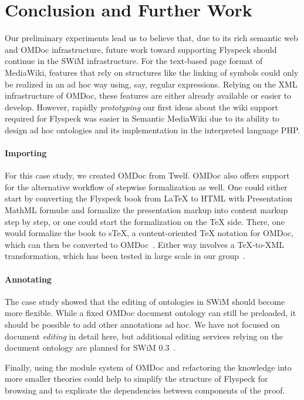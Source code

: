 
\section{Conclusion and Further Work}
\label{sec:conc}

Our preliminary experiments lead us to believe that, due to its rich
semantic web and OMDoc infrastructure, future work toward supporting
Flyspeck should continue in the SWiM infrastructure.  For the text-based
page format of MediaWiki, features that rely on structures like the
linking of symbols could only be realized in an ad hoc way
using, say, regular expressions.  Relying on the XML infrastructure of
OMDoc, these features are either already available or easier to develop.
However, rapidly \emph{prototyping} our first ideas about the wiki
support required for Flyspeck was easier in Semantic MediaWiki due to
its ability to design ad hoc ontologies and its implementation in the
interpreted language PHP.

\paragraph{Importing} For this case study, we created OMDoc from Twelf. OMDoc
also offers support for the alternative workflow of stepwise formalization as
well.  One could either start by converting the Flyspeck book from {\LaTeX} to
HTML with Presentation MathML formulæ and formalize the presentation markup into
content markup step by step, or one could start the formalization on the {\TeX}
side.  There, one would formalize the book to s\TeX{}, a content-oriented {\TeX}
notation for OMDoc, which can then be converted to OMDoc~\cite{Kohlhase:albwo06}.
Either way involves a {\TeX}-to-XML transformation, which has been tested in
large scale in our group~\cite{URL:arXMLiv}.

\paragraph{Annotating} The case study showed that the editing of ontologies in
SWiM should become more flexible.  While a fixed OMDoc document ontology can
still be preloaded, it should be possible to add other annotations ad hoc.  We
have not focused on document \emph{editing} in detail here, but additional
editing services relying on the document ontology are planned for SWiM
0.3~\cite{swim-roadmap,Lange:SWiMSciColl07}.

Finally, using the module system of OMDoc and refactoring the knowledge into
more smaller theories could help to simplify the structure of Flyspeck for
browsing and to explicate the dependencies between components of the proof.

